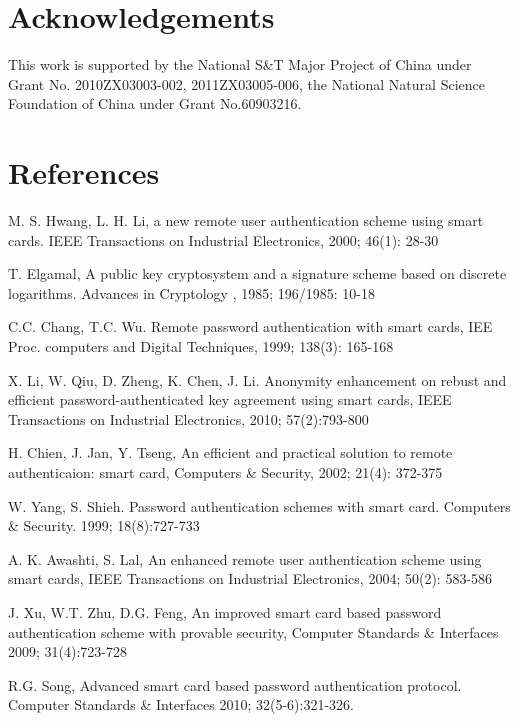 \documentclass[preprint,12pt]{elsarticle}
\begin{document}
\section*{Acknowledgements}
This work is supported by the National S\&T Major Project of China under Grant No. 2010ZX03003-002, 2011ZX03005-006, the National Natural Science Foundation of China under Grant No.60903216.

\section*{References}

\begin{thebibliography}{33}
M. S. Hwang, L. H. Li, a new remote user authentication scheme using smart cards. IEEE Transactions on Industrial Electronics, 2000; 46(1): 28-30

T. Elgamal, A public key cryptosystem and a signature scheme based on discrete logarithms. Advances in Cryptology , 1985; 196/1985: 10-18

C.C. Chang, T.C. Wu. Remote password authentication with smart cards, IEE Proc. computers and Digital Techniques, 1999; 138(3): 165-168

X. Li, W. Qiu, D. Zheng, K. Chen, J. Li. Anonymity enhancement on rebust and efficient password-authenticated key agreement using smart cards, IEEE Transactions on Industrial Electronics, 2010; 57(2):793-800

H. Chien, J. Jan, Y. Tseng, An efficient and practical solution to remote authenticaion: smart card, Computers \& Security, 2002; 21(4): 372-375

W. Yang, S. Shieh. Password authentication schemes with smart card. Computers \& Security. 1999; 18(8):727-733

A. K. Awashti, S. Lal, An enhanced remote user authentication scheme using smart cards, IEEE Transactions on Industrial Electronics, 2004; 50(2): 583-586

J. Xu, W.T. Zhu, D.G. Feng, An improved smart card based password authentication scheme with provable security, Computer Standards \& Interfaces
2009; 31(4):723-728

R.G. Song, Advanced smart card based password authentication protocol. Computer Standards \& Interfaces 2010; 32(5-6):321-326.


\end{thebibliography}
\end{document}
